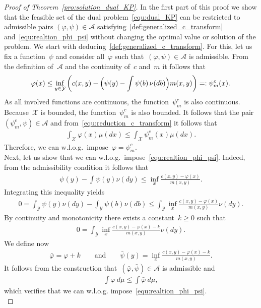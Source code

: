 \documentclass{article}
\theoremstyle{definition}
\begin{document}
\begin{proof}[Proof of Theorem~\ref{pro:solution_dual_KP}]
    In the first part of this proof we show that the feasible set of the dual problem~\eqref{equ:dual_KP} can be restricted to admissible pairs $(\varphi, \psi)\in \mathcal{A}$ satisfying~\eqref{def:generalized_c_transform} and~\eqref{equ:realtion_phi_psi} without changing the optimal value or solution of the problem. 
    We start with deducing~\eqref{def:generalized_c_transform}. For this, let us fix a function~$\psi$ and consider all~$\varphi$ such that~$(\varphi, \psi) \in \mathcal{A}$ is admissible. From the definition of~$\mathcal{A}$ and the continuity of~$c$ and~$m$ it follows that
    \begin{align} \label{equ:reduction_c_transform} 
        \varphi(x) \leq \inf_{y\in \mathcal{Y}} \left(  c(x,y) - \Bigl(\psi(y)-\int \psi (b)\,\nu(db)\Bigr)m(x,y) \right) =: \psi_{m}^c(x).
    \end{align}
    As all involved functions are continuous, the function~$\psi_m^c$ is also continuous. Because~$\mathcal{X}$ is bounded, the function~$\psi_m^c$ is also bounded. It follows that the pair~$(\psi_{m}^c, \psi) \in \mathcal{A}$ and from~\eqref{equ:reduction_c_transform} it follows that
    \begin{align*}
        \int_{\mathcal{X}} \varphi(x) \mu(dx) \leq \int_{\mathcal{X}}  \psi_{m}^c (x) \mu(dx).
    \end{align*}
    Therefore, we can w.l.o.g.~impose~$\varphi = \psi_{m}^c$. \\
    
    Next, let us show that we can w.l.o.g.~impose~\eqref{equ:realtion_phi_psi}. Indeed, from the admissibility condition it follows that 
\begin{align*}
    \psi(y) - \int \psi(y) \nu(dy)  \leq  \inf_x \frac{c(x,y)- \varphi(x)}{m(x,y)}.
\end{align*}
Integrating this inequality yields
\begin{align*}
    0 = \int_{\mathcal{Y}} \psi(y) \nu (dy) - \int_{\mathcal{Y}} \psi(b) \nu (db)  \leq \int_{\mathcal{Y}} \inf_x \frac{c(x,y)- \varphi(x)}{m(x,y)} \nu(dy).
\end{align*}
By continuity and monotonicity there exists a constant~$k\geq0$ such that
\begin{align*}
    0 = \int_{\mathcal{Y}} \inf_x \frac{c(x,y)- \varphi(x)-k}{m(x,y)} \nu(dy).
\end{align*}
We define now 
\begin{align*}
    \bar \varphi = \varphi + k \qquad \mbox{and} \qquad \bar \psi (y) = \inf_x \frac{c(x,y)- \varphi(x)-k}{m(x,y)}.
\end{align*}
It follows from the construction that~$(\bar \varphi, \bar \psi) \in \mathcal{A}$ is admissible and
\begin{align*}
    \int \varphi \  d\mu \leq  \int \bar \varphi \ d \mu,
\end{align*}
which verifies that we can w.l.o.g. impose~\eqref{equ:realtion_phi_psi}. \\


\end{proof}
\end{document}
